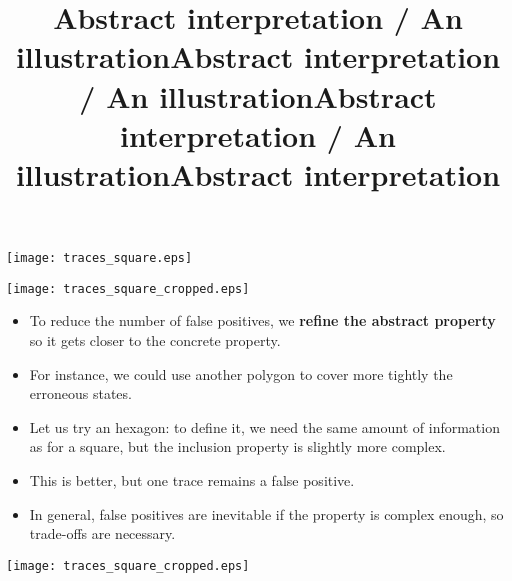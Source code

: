 \documentclass[wide]{slides}
\begin{document}
\begin{slide}
  \title{Abstract interpretation / An illustration}

  \begin{center}
    \texttt{[image: traces\_square.eps]}
  \end{center}

\end{slide}

\begin{slide}
  \title{Abstract interpretation / An illustration}

  \begin{center}
\texttt{[image: traces\_square\_cropped.eps]}
  \end{center}

\end{slide}

\begin{slide}
  \title{Abstract interpretation / An illustration}

  \begin{itemize}

    \item To reduce the number of false positives, we \textbf{refine
      the abstract property} so it gets closer to the concrete
      property.

    \item For instance, we could use another polygon to cover more
      tightly the erroneous states.

    \item Let us try an hexagon: to define it, we need the same amount
      of information as for a square, but the inclusion property is
      slightly more complex.

    \item This is better, but one trace remains a false positive.

    \item In general, false positives are inevitable if the property
      is complex enough, so trade\hyp{}offs are necessary.

  \end{itemize}

\end{slide}

\begin{slide}
  \title{Abstract interpretation}

  \begin{center}
    \texttt{[image: traces\_square\_cropped.eps]}
  \end{center}

\end{slide}
\end{document}
